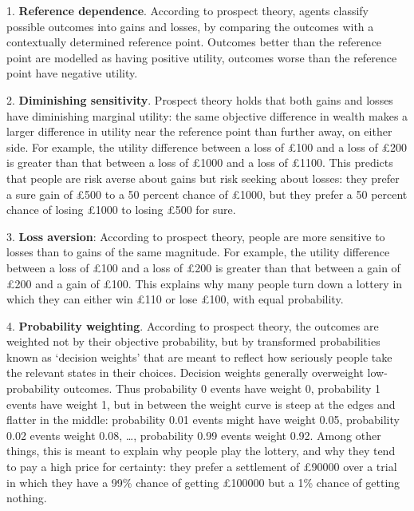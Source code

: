 1. \textbf{Reference dependence}. According to prospect theory, agents
classify possible outcomes into gains and losses, by comparing the
outcomes with a contextually determined reference point. Outcomes
better than the reference point are modelled as having positive
utility, outcomes worse than the reference point have negative
utility.

2. \textbf{Diminishing sensitivity}. Prospect theory holds that both
gains and losses have diminishing marginal utility: the same objective
difference in wealth makes a larger difference in utility near the
reference point than further away, on either side. For example, the
utility difference between a loss of £100 and a loss of £200 is
greater than that between a loss of £1000 and a loss of £1100. This
predicts that people are risk averse about gains but risk seeking
about losses: they prefer a sure gain of £500 to a 50 percent chance
of £1000, but they prefer a 50 percent chance of losing £1000 to
losing £500 for sure.

3. \textbf{Loss aversion}: According to prospect theory, people are
more sensitive to losses than to gains of the same magnitude. For
example, the utility difference between a loss of £100 and a loss of
£200 is greater than that between a gain of £200 and a gain of
£100. This explains why many people turn down a lottery in which they
can either win £110 or lose £100, with equal probability.

4. \textbf{Probability weighting}. According to prospect theory, the
outcomes are weighted not by their objective probability, but by
transformed probabilities known as `decision weights' that are meant
to reflect how seriously people take the relevant states in their
choices. Decision weights generally overweight low-probability
outcomes. Thus probability 0 events have weight 0, probability 1
events have weight 1, but in between the weight curve is steep at the edges
and flatter in the middle: probability 0.01 events might have weight
0.05, probability 0.02 events weight 0.08, \ldots, probability 0.99
events weight 0.92. Among other things, this is meant to explain why
people play the lottery, and why they tend to pay a high price for
certainty: they prefer a settlement of £90000 over a trial in which
they have a 99\% chance of getting £100000 but a 1\% chance of
getting nothing.%



